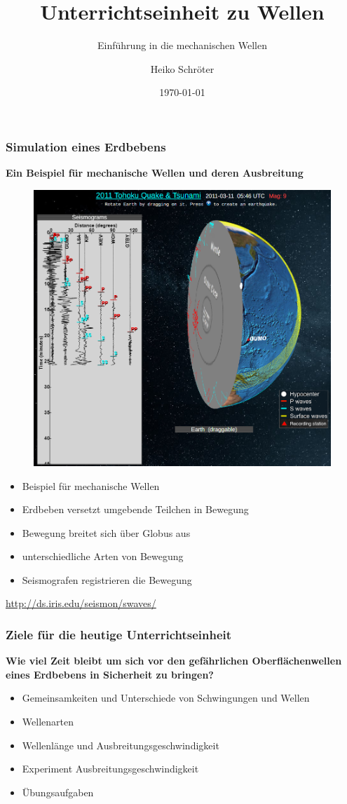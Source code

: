 \documentclass{beamer}
\title{Unterrichtseinheit zu Wellen}
\subtitle{Einführung in die mechanischen Wellen}
\author{Heiko Schröter}
\date{\today}
\begin{document}
\frame{\titlepage}

\frame
{
  \frametitle{Simulation eines Erdbebens}
  \textbf{Ein Beispiel für mechanische Wellen und deren Ausbreitung}
	\begin{figure}
	\includegraphics[scale=0.15]{iris}
	\end{figure}
	\begin{itemize}
	\item Beispiel für mechanische Wellen
	\item Erdbeben versetzt umgebende Teilchen in Bewegung
	\item Bewegung breitet sich über Globus aus
	\item unterschiedliche Arten von Bewegung
	\item Seismografen registrieren die Bewegung
	\end{itemize}
	\url{http://ds.iris.edu/seismon/swaves/}
}

\frame
{
  \frametitle{Ziele für die heutige Unterrichtseinheit}
  \textbf{Wie viel Zeit bleibt um sich vor den gefährlichen Oberflächenwellen eines Erdbebens in Sicherheit zu bringen?}
  \begin{itemize}
	\item Gemeinsamkeiten und Unterschiede von Schwingungen und Wellen
	\item Wellenarten
	\item Wellenlänge und Ausbreitungsgeschwindigkeit
	\item Experiment Ausbreitungsgeschwindigkeit
	\item Übungsaufgaben
  \end{itemize}
}
\end{document}
